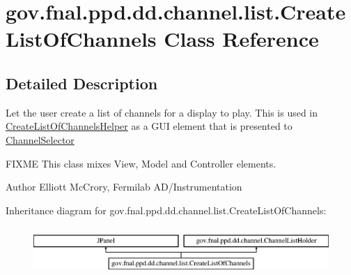 \hypertarget{classgov_1_1fnal_1_1ppd_1_1dd_1_1channel_1_1list_1_1CreateListOfChannels}{\section{gov.\-fnal.\-ppd.\-dd.\-channel.\-list.\-Create\-List\-Of\-Channels Class Reference}
\label{classgov_1_1fnal_1_1ppd_1_1dd_1_1channel_1_1list_1_1CreateListOfChannels}
}


\subsection{Detailed Description}
Let the user create a list of channels for a display to play. This is used in \hyperlink{classgov_1_1fnal_1_1ppd_1_1dd_1_1channel_1_1list_1_1CreateListOfChannelsHelper}{Create\-List\-Of\-Channels\-Helper} as a G\-U\-I element that is presented to \hyperlink{classgov_1_1fnal_1_1ppd_1_1dd_1_1ChannelSelector}{Channel\-Selector}

F\-I\-X\-M\-E This class mixes View, Model and Controller elements.

\begin{DoxyAuthor}{Author}
Elliott Mc\-Crory, Fermilab A\-D/\-Instrumentation 
\end{DoxyAuthor}
Inheritance diagram for gov.\-fnal.\-ppd.\-dd.\-channel.\-list.\-Create\-List\-Of\-Channels\-:\begin{figure}[H]
\begin{center}
\leavevmode
\includegraphics[height=1.836066cm]{classgov_1_1fnal_1_1ppd_1_1dd_1_1channel_1_1list_1_1CreateListOfChannels}
\end{center}
\end{figure}
